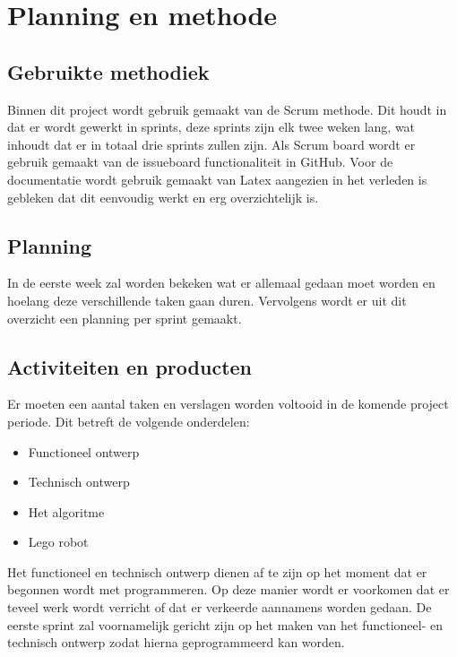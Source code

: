 \section{Planning en methode}

\subsection{Gebruikte methodiek}
Binnen dit project wordt gebruik gemaakt van de Scrum methode. Dit houdt
in dat er wordt gewerkt in sprints, deze sprints zijn elk twee
weken lang, wat inhoudt dat er in totaal drie sprints zullen zijn. Als
Scrum board wordt er gebruik gemaakt van de issueboard functionaliteit
in GitHub. Voor de documentatie wordt gebruik gemaakt van Latex aangezien
in het verleden is gebleken dat dit eenvoudig werkt en erg overzichtelijk is.


\subsection{Planning}
In de eerste week zal worden bekeken wat er allemaal gedaan moet worden en 
hoelang deze verschillende taken gaan duren. Vervolgens wordt er uit dit
overzicht een planning per sprint gemaakt.


\subsection{Activiteiten en producten}
Er moeten een aantal taken en verslagen worden voltooid in de komende
project periode. Dit betreft de volgende onderdelen:
\begin{itemize}
  	\item Functioneel ontwerp
  	\item Technisch ontwerp
	\item Het algoritme
	\item Lego robot
\end{itemize}
Het functioneel en technisch ontwerp dienen af te zijn op het moment dat 
er begonnen wordt met programmeren. Op deze manier wordt er voorkomen 
dat er teveel werk wordt verricht of dat er verkeerde aannamens worden 
gedaan. De eerste sprint zal voornamelijk gericht zijn op het maken van 
het functioneel- en technisch ontwerp zodat hierna geprogrammeerd kan
worden.

	
